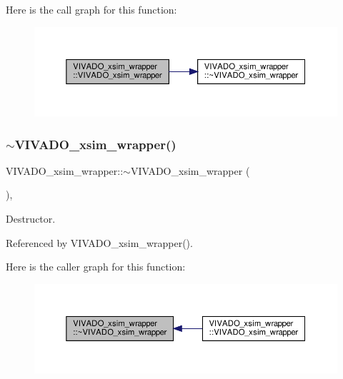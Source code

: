 Here is the call graph for this function\+:
\nopagebreak
\begin{figure}[H]
\begin{center}
\leavevmode
\includegraphics[width=350pt]{d9/d77/classVIVADO__xsim__wrapper_a9f6e3b67622e26c6fd19d315bab1f7c4_cgraph}
\end{center}
\end{figure}
\mbox{\label{classVIVADO__xsim__wrapper_ab6df03864d1f9c31337dde08212c3149}} 
\subsubsection{\texorpdfstring{$\sim$\+V\+I\+V\+A\+D\+O\+\_\+xsim\+\_\+wrapper()}{~VIVADO\_xsim\_wrapper()}}
{\footnotesize\ttfamily V\+I\+V\+A\+D\+O\+\_\+xsim\+\_\+wrapper\+::$\sim$\+V\+I\+V\+A\+D\+O\+\_\+xsim\+\_\+wrapper (\begin{DoxyParamCaption}{ }\end{DoxyParamCaption})\hspace{0.3cm}{\ttfamily [override]}, {\ttfamily [default]}}



Destructor. 



Referenced by V\+I\+V\+A\+D\+O\+\_\+xsim\+\_\+wrapper().

Here is the caller graph for this function\+:
\nopagebreak
\begin{figure}[H]
\begin{center}
\leavevmode
\includegraphics[width=350pt]{d9/d77/classVIVADO__xsim__wrapper_ab6df03864d1f9c31337dde08212c3149_icgraph}
\end{center}
\end{figure}


